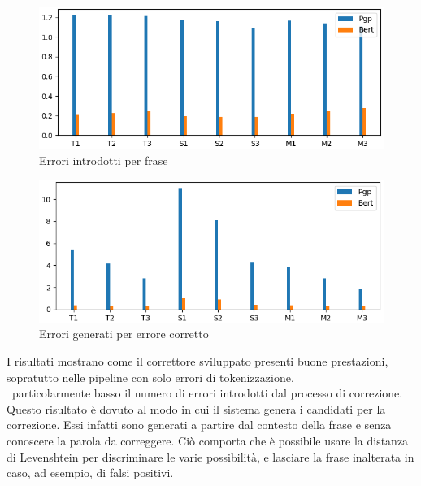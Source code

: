 \documentclass[12pt]{article}
\begin{document}
\begin{figure}[H]
\includegraphics[width=\textwidth]{immagini/ips}
\caption{Errori introdotti per frase}
\end{figure}

\begin{figure}[H]
\includegraphics[width=\textwidth]{immagini/ipc}
\caption{Errori generati per errore corretto}
\end{figure}

I risultati mostrano come il correttore sviluppato presenti buone prestazioni, sopratutto nelle pipeline con solo errori di tokenizzazione.\\
\E\ particolarmente basso il numero di errori introdotti dal processo di correzione. Questo risultato è dovuto al modo in cui il sistema genera i candidati per la correzione. Essi infatti sono generati a partire dal contesto della frase e senza conoscere la parola da correggere. Ciò comporta che è possibile usare la distanza di Levenshtein per discriminare le varie possibilità, e lasciare la frase inalterata in caso, ad esempio, di falsi positivi.
\end{document}
